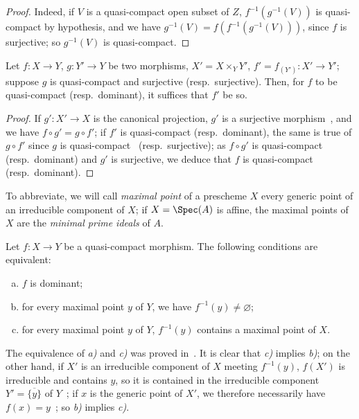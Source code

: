 \begin{proof}
Indeed, if $V$ is a quasi-compact open subset of $Z$, $f^{-1}(g^{-1}(V))$ is quasi-compact
by hypothesis, and we have $g^{-1}(V)=f(f^{-1}(g^{-1}(V)))$, since $f$ is surjective; so $g^{-1}(V)$
is quasi-compact.
\end{proof}

\begin{corollary}[1.1.4]
\label{IV.1.1.4}
Let $f:X\to Y$, $g:Y'\to Y$ be two morphisms, $X'=X\times_Y Y'$,
$f'=f_{(Y')}:X'\to Y'$; suppose $g$ is quasi-compact and surjective \textnormal{(}resp.\ surjective\textnormal{)}. Then, for $f$ to be
quasi-compact \textnormal{(}resp.\ dominant\textnormal{)}, it suffices that $f'$ be so.
\end{corollary}

\begin{proof}
If $g':X'\to X$ is the canonical projection, $g'$ is a surjective morphism~,
and we have $f\circ g'=g\circ f'$; if $f'$ is quasi-compact (resp.\ dominant), the same is true of $g\circ f'$
since $g$ is quasi-compact~ (resp.\ surjective); as $f\circ g'$ is quasi-compact
(resp.\ dominant) and $g'$ is surjective, we deduce that $f$ is quasi-compact~
(resp.\ dominant).
\end{proof}


To abbreviate, we will call \emph{maximal point} of a prescheme $X$ every generic point
of an irreducible component of $X$; if $X=\Spec(A)$ is affine, the maximal points
of $X$ are the \emph{minimal prime ideals} of $A$.

\begin{proposition}[1.1.5]
\label{IV.1.1.5}
Let $f:X\to Y$ be a quasi-compact morphism. The following
conditions are equivalent:
\begin{enumerate}[a)]
  \item $f$ is dominant;
  \item for every maximal point $y$ of $Y$, we have $f^{-1}(y)\neq\varnothing$;
  \item for every maximal point $y$ of $Y$, $f^{-1}(y)$ contains a maximal point of $X$.
\end{enumerate}
\end{proposition}

The equivalence of \emph{a)} and \emph{c)} was proved in~. It is clear that \emph{c)}
implies \emph{b)}; on the other hand, if $X'$ is an irreducible component of $X$ meeting $f^{-1}(y)$,
$f(X')$ is irreducible and contains $y$, so it is contained in the irreducible component
$Y'=\overline{\{y\}}$ of $Y$~; if $x$ is the generic point of $X'$, we therefore necessarily have
$f(x)=y$~; so \emph{b)} implies \emph{c)}.

